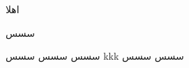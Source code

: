 \documentclass{article}
\begin{document}
اهلا

\newpage

سسس
\newpage

سسس
\newpage
{}
سسس
\newpage
{}
سسس
\newpage
{}
kkk
\newpage
{}
سسس
\newpage
{}
سسس
\newpage
\end{document}
